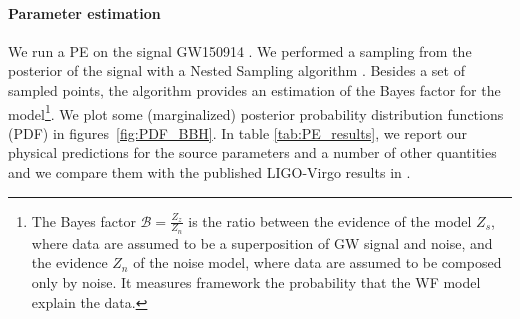 \paragraph{Parameter estimation}
We run a PE on the signal GW150914 \cite{Abbott2016GW150914}.
We performed a sampling from the posterior of the signal with a Nested Sampling algorithm \cite{skilling2006nested_sampling} \cite{Aasi:2013jjl}.
Besides a set of sampled points, the algorithm provides an estimation of the Bayes factor for the model\footnote{The Bayes factor $\mathcal{B}=\frac{Z_z}{Z_n}$ is the ratio between the evidence of the model $Z_s$, where data are assumed to be a superposition of GW signal and noise, and the evidence $Z_n$ of the noise model, where data are assumed to be composed only by noise. It measures framework the probability that the WF model explain the data.}.
We plot some (marginalized) posterior probability distribution functions (PDF) in figures~\ref{fig:PDF_BBH}.
In table \ref{tab:PE_results}, we report our physical predictions for the source parameters and a number of other quantities and we compare them with the published LIGO-Virgo results in \cite{Abbott_2016_GW150914prop}.
\par
